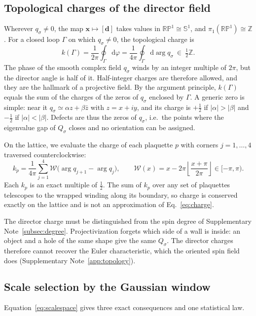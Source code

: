 \documentclass[11pt,a4paper]{article}
\newcommand{\dd}{\mathrm{d}}
\newcommand{\RP}{\mathbb{RP}}
\newcommand{\Sn}{\mathbb S}
\begin{document}
\subsection{Topological charges of the director field}\label{subsec:charge}
Wherever $q_\sigma\neq0$, the map $\bm x\mapsto[\bm d]$ takes values in $\RP^1\cong\Sn^1$, and $\pi_1(\RP^1)\cong\mathbb Z$. For a closed loop $\Gamma$ on which $q_\sigma\neq0$, the topological charge is
\begin{equation}
 k(\Gamma)=\frac1{2\pi}\oint_\Gamma\dd\varphi=\frac1{4\pi}\oint_\Gamma\dd\arg q_\sigma\ \in\ \tfrac12\mathbb Z .
 \label{eq:charge}
\end{equation}
The phase of the smooth complex field $q_\sigma$ winds by an integer multiple of $2\pi$, but the director angle is half of it. Half-integer charges are therefore allowed, and they are the hallmark of a projective field. By the argument principle, $k(\Gamma)$ equals the sum of the charges of the zeros of $q_\sigma$ enclosed by $\Gamma$. A generic zero is simple: near it $q_\sigma\simeq\alpha z+\beta\bar z$ with $z=x+iy$, and its charge is $+\tfrac12$ if $|\alpha|>|\beta|$ and $-\tfrac12$ if $|\alpha|<|\beta|$. Defects are thus the zeros of $q_\sigma$, i.e.\ the points where the eigenvalue gap of $Q_\sigma$ closes and no orientation can be assigned.

On the lattice, we evaluate the charge of each plaquette $p$ with corners $j=1,\dots,4$ traversed counterclockwise:
\begin{equation}
 k_p=\frac1{4\pi}\sum_{j=1}^{4}\mathcal W\bigl(\arg q_{j+1}-\arg q_j\bigr),\qquad
 \mathcal W(x)=x-2\pi\left\lfloor\frac{x+\pi}{2\pi}\right\rfloor\in[-\pi,\pi).
 \label{eq:latticecharge}
\end{equation}
Each $k_p$ is an exact multiple of $\tfrac12$. The sum of $k_p$ over any set of plaquettes telescopes to the wrapped winding along its boundary, so charge is conserved exactly on the lattice and is not an approximation of Eq.~\eqref{eq:charge}.

The director charge must be distinguished from the spin degree of Supplementary Note~\ref{subsec:degree}. Projectivization forgets which side of a wall is inside: an object and a hole of the same shape give the same $Q_\sigma$. The director charges therefore cannot recover the Euler characteristic, which the oriented spin field does (Supplementary Note~\ref{app:topology}).

\subsection{Scale selection by the Gaussian window}\label{subsec:scale}
Equation~\eqref{eq:scalespace} gives three exact consequences and one statistical law.
\end{document}
